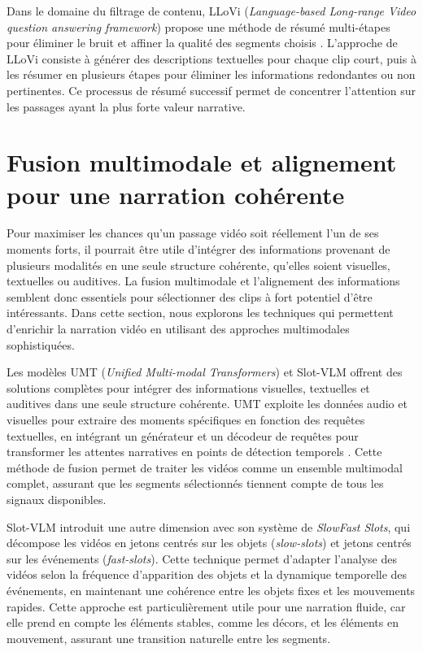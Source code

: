 \documentclass[livre]{udes-genie-these}
\begin{document}
Dans le domaine du filtrage de contenu, LLoVi (\textit{Language-based Long-range Video question answering framework}) \cite{zhang2023} propose une méthode de résumé multi-étapes pour éliminer le bruit et affiner la qualité des segments choisis \cite{anonymous2023_valley}\cite{zhang2019_memory}. L’approche de LLoVi consiste à générer des descriptions textuelles pour chaque clip court, puis à les résumer en plusieurs étapes pour éliminer les informations redondantes ou non pertinentes. Ce processus de résumé successif permet de concentrer l’attention sur les passages ayant la plus forte valeur narrative. 

\section{Fusion multimodale et alignement pour une narration cohérente}

Pour maximiser les chances qu’un passage vidéo soit réellement l’un de ses moments forts, il pourrait être utile d’intégrer des informations provenant de plusieurs modalités en une seule structure cohérente, qu’elles soient visuelles, textuelles ou auditives. La fusion multimodale et l’alignement des informations semblent donc essentiels pour sélectionner des clips à fort potentiel d’être intéressants. Dans cette section, nous explorons les techniques qui permettent d’enrichir la narration vidéo en utilisant des approches multimodales sophistiquées. 

Les modèles UMT (\textit{Unified Multi-modal Transformers}) \cite{liu2022_umt} et Slot-VLM \cite{xu2024} offrent des solutions complètes pour intégrer des informations visuelles, textuelles et auditives dans une seule structure cohérente. UMT exploite les données audio et visuelles pour extraire des moments spécifiques en fonction des requêtes textuelles, en intégrant un générateur et un décodeur de requêtes pour transformer les attentes narratives en points de détection temporels \cite{liu2022_umt}. Cette méthode de fusion permet de traiter les vidéos comme un ensemble multimodal complet, assurant que les segments sélectionnés tiennent compte de tous les signaux disponibles.

Slot-VLM  \cite{xu2024} introduit une autre dimension avec son système de \textit{SlowFast Slots}, qui décompose les vidéos en jetons centrés sur les objets (\textit{slow-slots}) et jetons centrés sur les événements (\textit{fast-slots}). Cette technique permet d’adapter l’analyse des vidéos selon la fréquence d’apparition des objets et la dynamique temporelle des événements, en maintenant une cohérence entre les objets fixes et les mouvements rapides. Cette approche est particulièrement utile pour une narration fluide, car elle prend en compte les éléments stables, comme les décors, et les éléments en mouvement, assurant une transition naturelle entre les segments.
\end{document}
